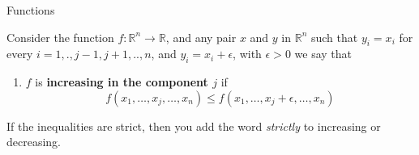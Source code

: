 \documentclass[aspectratio=169, handout]{beamer}
\begin{document}
\begin{frame}{Functions}
    \begin{definition}
        Consider the function $f:\mathds{R}^n\rightarrow\mathds{R}$, and any pair $x$ and $y$ in $\mathds{R}^n$ such that $y_i=x_i$ for every $i=1,.,j-1,j+1,..,n$, and $y_i=x_i+\epsilon$, with $\epsilon>0$ we say that
        \begin{enumerate}
            \item $f$ is \textbf{increasing in the component $j$} if $$f(x_1,\ldots,x_j,\ldots,x_n)\leq f(x_1,\ldots,x_j+\epsilon,\ldots,x_n)$$
        \end{enumerate}
    \end{definition}
    
    If the inequalities are strict, then you add the word \emph{strictly} to increasing or decreasing.
\end{frame}
\end{document}
